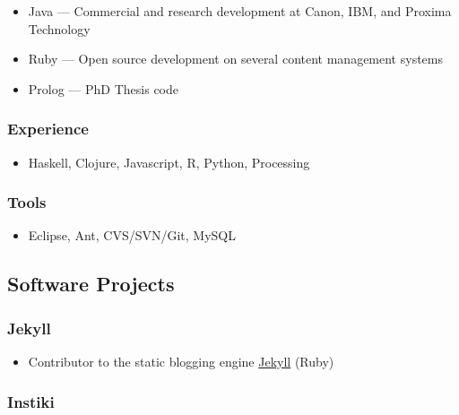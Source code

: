 \documentclass{article}
\begin{document}
\begin{itemize}%
\item Java ---{} Commercial and research development at Canon, IBM, and Proxima Technology
\item Ruby ---{} Open source development on several content management systems
\item Prolog ---{} PhD Thesis code

\end{itemize}
\hypertarget{experience}{}\subsubsection*{{Experience}}\label{experience}

\begin{itemize}%
\item Haskell, Clojure, Javascript, R, Python, Processing

\end{itemize}
\hypertarget{tools}{}\subsubsection*{{Tools}}\label{tools}

\begin{itemize}%
\item Eclipse, Ant, CVS/SVN/Git, MySQL

\end{itemize}
\hypertarget{software_projects}{}\subsection*{{Software Projects}}\label{software_projects}

\hypertarget{jekyll}{}\subsubsection*{{Jekyll}}\label{jekyll}

\begin{itemize}%
\item Contributor to the static blogging engine \href{https://github.com/mojombo/jekyll}{Jekyll} (Ruby)

\end{itemize}
\hypertarget{instiki}{}\subsubsection*{{Instiki}}\label{instiki}
\end{document}
